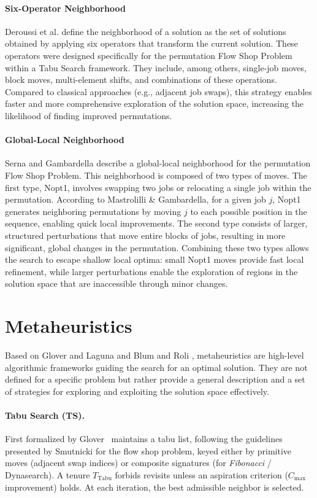 \documentclass[runningheads]{llncs}
\begin{document}
\paragraph{Six-Operator Neighborhood}
Deroussi et al. \cite{deroussi2006} define the neighborhood of a solution as the set of solutions obtained by applying six operators that transform the current solution. These operators were designed specifically for the permutation Flow Shop Problem within a Tabu Search framework. They include, among others, single-job moves, block moves, multi-element shifts, and combinations of these operations. Compared to classical approaches (e.g., adjacent job swaps), this strategy enables faster and more comprehensive exploration of the solution space, increasing the likelihood of finding improved permutations.

\paragraph{Global-Local Neighborhood}
Serna and Gambardella \cite{serna2000} describe a global-local neighborhood for the permutation Flow Shop Problem. This neighborhood is composed of two types of moves. The first type, Nopt1, involves swapping two jobs or relocating a single job within the permutation. According to Mastrolilli \& Gambardella, for a given job $j$, Nopt1 generates neighboring permutations by moving $j$ to each possible position in the sequence, enabling quick local improvements. The second type consists of larger, structured perturbations that move entire blocks of jobs, resulting in more significant, global changes in the permutation. Combining these two types allows the search to escape shallow local optima: small Nopt1 moves provide fast local refinement, while larger perturbations enable the exploration of regions in the solution space that are inaccessible through minor changes.


\section{Metaheuristics}
Based on Glover and Laguna \cite{glover1997} and Blum and Roli \cite{ref_metaheuristics_survey}, metaheuristics are high-level algorithmic frameworks guiding the search for an optimal solution. They are not defined for a specific problem but rather provide a general description and a set of strategies for exploring and exploiting the solution space effectively.


\paragraph{Tabu Search (TS).} First formalized by 
Glover~\cite{glover1986} maintains a tabu list, following the guidelines presented by Smutnicki \cite{smutnicki2012} for the flow shop problem, keyed either by primitive moves (adjacent swap indices) or composite signatures (for \emph{Fibonacci} / Dynasearch). A tenure $T_{\text{Tabu}}$ forbids revisits unless an aspiration criterion ($C_{\max}$ improvement) holds. At each iteration, the best admissible neighbor is selected.
\end{document}

